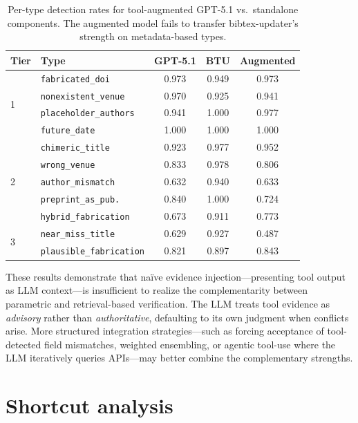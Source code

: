 \begin{table}[t]
\caption{Per-type detection rates for tool-augmented GPT-5.1 vs.\ standalone components. The augmented model fails to transfer bibtex-updater's strength on metadata-based types.}
\label{tab:tool_augmented_pertype}
\centering
\small
\setlength{\tabcolsep}{3pt}
\begin{tabular}{llccc}
\toprule
\textbf{Tier} & \textbf{Type} & \textbf{GPT-5.1} & \textbf{BTU} & \textbf{Augmented} \\
\midrule
\multirow{4}{*}{1}
& \texttt{fabricated\_doi}        & 0.973 & 0.949 & 0.973 \\
& \texttt{nonexistent\_venue}     & 0.970 & 0.925 & 0.941 \\
& \texttt{placeholder\_authors}   & 0.941 & 1.000 & 0.977 \\
& \texttt{future\_date}           & 1.000 & 1.000 & 1.000 \\
\midrule
\multirow{5}{*}{2}
& \texttt{chimeric\_title}        & 0.923 & 0.977 & 0.952 \\
& \texttt{wrong\_venue}           & 0.833 & 0.978 & 0.806 \\
& \texttt{author\_mismatch}       & 0.632 & 0.940 & 0.633 \\
& \texttt{preprint\_as\_pub.}     & 0.840 & 1.000 & 0.724 \\
& \texttt{hybrid\_fabrication}    & 0.673 & 0.911 & 0.773 \\
\midrule
\multirow{2}{*}{3}
& \texttt{near\_miss\_title}      & 0.629 & 0.927 & 0.487 \\
& \texttt{plausible\_fabrication} & 0.821 & 0.897 & 0.843 \\
\bottomrule
\end{tabular}
\end{table}

These results demonstrate that na\"ive evidence injection---presenting tool output as LLM context---is insufficient to realize the complementarity between parametric and retrieval-based verification.
The LLM treats tool evidence as \emph{advisory} rather than \emph{authoritative}, defaulting to its own judgment when conflicts arise.
More structured integration strategies---such as forcing acceptance of tool-detected field mismatches, weighted ensembling, or agentic tool-use where the LLM iteratively queries APIs---may better combine the complementary strengths.

\section{Shortcut analysis}
\label{app:shortcuts}

